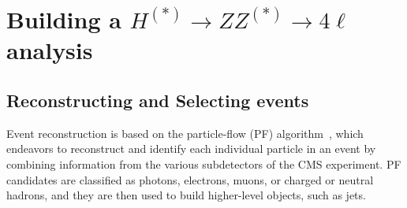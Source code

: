 
\section{Building a $H^{(*)} \to ZZ^{(*)} \to 4\ell$ analysis}

\subsection{Reconstructing and Selecting events} \label{sec:recoandsel}



Event reconstruction is based on the particle-flow (PF) algorithm~\cite{Sirunyan:2017ulk}, which endeavors to reconstruct and identify each individual particle in an event by combining information from the various subdetectors of the CMS experiment. PF candidates are classified as photons, electrons, muons, or charged or neutral hadrons, and they are then used to build higher-level objects, such as jets. 

